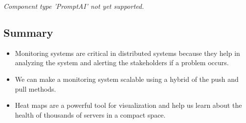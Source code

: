 \textit{Component type 'PromptAI' not yet supported.}

\subsection{Summary}\label{vVUdj_GnfgSDERL81TF1U}

\begin{itemize}
\item
\protect{}\label{OeDzDsb8_8I9VMNICwBji}
Monitoring systems are critical in distributed systems because they help in analyzing the system and alerting the stakeholders if a problem occurs.
\item
\protect{}\label{xh4QgPJQMuhfIDiGuDlXB}
We can make a monitoring system scalable using a hybrid of the push and pull methods.
\item
\protect{}\label{pHKTBrzYdeqyMuk56WqvV}
Heat maps are a powerful tool for visualization and help us learn about the health of thousands of servers in a compact space.
\end{itemize}

